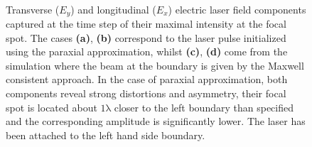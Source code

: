 \begin{figure}[h!]
	\centering
	\hspace{1mm}
	\\
	\hspace{1mm}
	\caption{Transverse ($ E_{y} $) and longitudinal ($ E_{x} $) electric laser field components captured at the time step of their maximal intensity at the focal spot. The cases \textbf{(a)}, \textbf{(b)} correspond to the laser pulse initialized using the paraxial approximation, whilst \textbf{(c)}, \textbf{(d)} come from the simulation where the beam at the boundary is given by the Maxwell consistent approach. In the case of paraxial approximation, both components reveal strong distortions and asymmetry, their focal spot is located about $ \mathrm{1 \lambda} $ closer to the left boundary than specified and the corresponding amplitude is significantly lower. The laser has been attached to the left hand side boundary.}
	\label{fig:1}
\end{figure}

